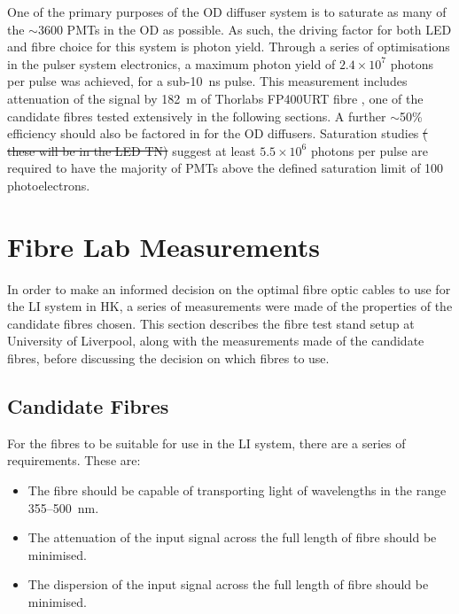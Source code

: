 \documentclass[a4paper,11pt]{article}
\let\oldsim\sim
\renewcommand{\sim}{{\oldsim}}
\providecommand{\DIFaddtex}[1]{{\protect\color{blue}\uwave{#1}}} %
\providecommand{\DIFdeltex}[1]{{\protect\color{red}\sout{#1}}}                      %
\providecommand{\DIFaddbegin}{} %
\providecommand{\DIFaddend}{} %
\providecommand{\DIFdelbegin}{} %
\providecommand{\DIFdelend}{} %
\providecommand{\DIFadd}[1]{\texorpdfstring{\DIFaddtex{#1}}{#1}} %
\providecommand{\DIFdel}[1]{\texorpdfstring{\DIFdeltex{#1}}{}} %
\newcommand{\DIFscaledelfig}{0.5}
\newlength{\DIFdelgraphicswidth} %
\newlength{\DIFdelgraphicsheight} %
\newcommand{\DIFaddincludegraphics}[2][]{{\color{blue}\fbox{\DIFOincludegraphics[#1]{#2}}}} %
\newcommand{\DIFdelincludegraphics}[2][]{%
\sbox{\DIFdelgraphicsbox}{\DIFOincludegraphics[#1]{#2}}%
\settoboxwidth{\DIFdelgraphicswidth}{\DIFdelgraphicsbox} %
\settoboxtotalheight{\DIFdelgraphicsheight}{\DIFdelgraphicsbox} %
\scalebox{\DIFscaledelfig}{%
\parbox[b]{\DIFdelgraphicswidth}{\usebox{\DIFdelgraphicsbox}\\[-\baselineskip] \rule{\DIFdelgraphicswidth}{0em}}\llap{\resizebox{\DIFdelgraphicswidth}{\DIFdelgraphicsheight}{%
\setlength{\unitlength}{\DIFdelgraphicswidth}%
\begin{picture}(1,1)%
\thicklines\linethickness{2pt} %
{\color[rgb]{1,0,0}\put(0,0){\framebox(1,1){}}}%
{\color[rgb]{1,0,0}\put(0,0){\line( 1,1){1}}}%
{\color[rgb]{1,0,0}\put(0,1){\line(1,-1){1}}}%
\end{picture}%
}\hspace*{3pt}}} %
} %
\DeclareRobustCommand{\DIFaddbegin}{\DIFOaddbegin \let\includegraphics\DIFaddincludegraphics} %
\DeclareRobustCommand{\DIFaddend}{\DIFOaddend \let\includegraphics\DIFOincludegraphics} %
\DeclareRobustCommand{\DIFdelbegin}{\DIFOdelbegin \let\includegraphics\DIFdelincludegraphics} %
\DeclareRobustCommand{\DIFdelend}{\DIFOaddend \let\includegraphics\DIFOincludegraphics} %
\begin{document}
One of the primary purposes of the OD diffuser system is to saturate as many of the $\sim3600$ PMTs in the OD as possible. As such, the driving factor for both LED and fibre choice for this system is photon yield. Through a series of optimisations in the pulser system electronics, a maximum photon yield of $2.4\times10^{7}$ photons per pulse was achieved, for a sub-10~ns pulse. This measurement includes attenuation of the signal by 182~m of Thorlabs FP400URT fibre \cite{bib:fp400urt}, one of the candidate fibres tested extensively in the following sections. A further $\sim$50\% efficiency should also be factored in for the OD diffusers. Saturation studies \DIFdelbegin \DIFdel{(}%
\DIFdel{these will be in the LED TN)}%
\DIFdelend \DIFaddbegin \DIFadd{shown in \mbox{%
\cite{bib:tn0111} }\hskip0pt%
}\DIFaddend suggest at least \DIFdelbegin \DIFdel{$5.5\times10^6$ }\DIFdelend \DIFaddbegin \DIFadd{$10\times10^6$ }\DIFaddend photons per pulse are required to have the majority of PMTs above the defined saturation limit of 100 photoelectrons.


\section{Fibre Lab Measurements}

In order to make an informed decision on the optimal fibre optic cables to use for the LI system in HK, a series of measurements were made of the properties of the candidate fibres chosen. This section describes the fibre test stand setup at University of Liverpool, along with the measurements made of the candidate fibres, before discussing the decision on which fibres to use.

\subsection{Candidate Fibres}

For the fibres to be suitable for use in the LI system, there are a series of requirements. These are:
\begin{itemize}
\item The fibre should be capable of transporting light of wavelengths in the range 355--500~nm.
\item The attenuation of the input signal across the full length of fibre should be minimised.
\item The dispersion of the input signal across the full length of fibre should be minimised.
\end{itemize}
\end{document}
